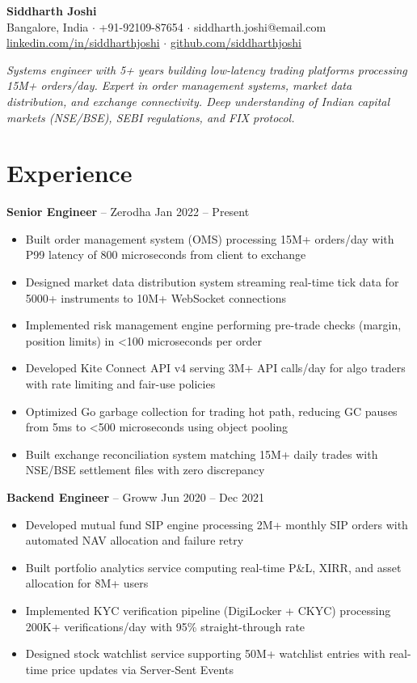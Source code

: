 \documentclass[10pt,a4paper]{article}
\begin{document}
{\Large\bfseries Siddharth Joshi}\\[3pt]
{\small Bangalore, India $\cdot$ +91-92109-87654 $\cdot$ siddharth.joshi@email.com}\\
{\small \href{https://linkedin.com/in/siddharthjoshi}{linkedin.com/in/siddharthjoshi} $\cdot$ \href{https://github.com/siddharthjoshi}{github.com/siddharthjoshi}}

\vspace{4pt}
{\small\itshape Systems engineer with 5+ years building low-latency trading platforms processing 15M+ orders/day. Expert in order management systems, market data distribution, and exchange connectivity. Deep understanding of Indian capital markets (NSE/BSE), SEBI regulations, and FIX protocol.}

\section{Experience}

\textbf{Senior Engineer} -- Zerodha \hfill {\color{accent}\small Jan 2022 -- Present}
\begin{itemize}
    \item Built order management system (OMS) processing 15M+ orders/day with P99 latency of 800 microseconds from client to exchange
    \item Designed market data distribution system streaming real-time tick data for 5000+ instruments to 10M+ WebSocket connections
    \item Implemented risk management engine performing pre-trade checks (margin, position limits) in <100 microseconds per order
    \item Developed Kite Connect API v4 serving 3M+ API calls/day for algo traders with rate limiting and fair-use policies
    \item Optimized Go garbage collection for trading hot path, reducing GC pauses from 5ms to <500 microseconds using object pooling
    \item Built exchange reconciliation system matching 15M+ daily trades with NSE/BSE settlement files with zero discrepancy
\end{itemize}

\textbf{Backend Engineer} -- Groww \hfill {\color{accent}\small Jun 2020 -- Dec 2021}
\begin{itemize}
    \item Developed mutual fund SIP engine processing 2M+ monthly SIP orders with automated NAV allocation and failure retry
    \item Built portfolio analytics service computing real-time P\&L, XIRR, and asset allocation for 8M+ users
    \item Implemented KYC verification pipeline (DigiLocker + CKYC) processing 200K+ verifications/day with 95\% straight-through rate
    \item Designed stock watchlist service supporting 50M+ watchlist entries with real-time price updates via Server-Sent Events
\end{itemize}
\end{document}
